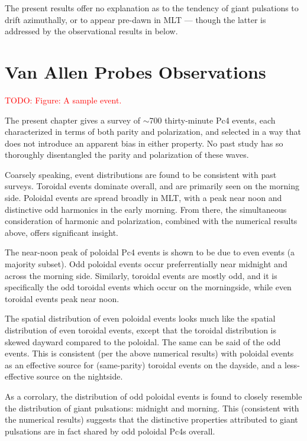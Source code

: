 \documentclass{article}
\newcommand{\about}{\ensuremath{\sim}}
\newcommand{\todo}[1]{ \textcolor{red}{TODO: #1} }
\begin{document}
The present results offer no explanation as to the tendency of giant
pulsations to drift azimuthally, or to appear pre-dawn in MLT --- though
the latter is addressed by the observational results in below.


\section{Van Allen Probes Observations}

\todo{Figure: A sample event.}

The present chapter gives a survey of \about700 thirty-minute Pc4
events, each characterized in terms of both parity and polarization, and
selected in a way that does not introduce an apparent bias in either
property. No past study has so thoroughly disentangled the parity and
polarization of these waves.

Coarsely speaking, event distributions are found to be consistent with
past surveys. Toroidal events dominate overall, and are primarily seen
on the morning side. Poloidal events are spread broadly in MLT, with a
peak near noon and distinctive odd harmonics in the early morning. From
there, the simultaneous consideration of harmonic and polarization,
combined with the numerical results above, offers significant insight.

The near-noon peak of poloidal Pc4 events is shown to be due to even
events (a majority subset). Odd poloidal events occur preferrentially
near midnight and across the morning side. Similarly, toroidal events
are mostly odd, and it is specifically the odd toroidal events which
occur on the morningside, while even toroidal events peak near noon.

The spatial distribution of even poloidal events looks much like the
spatial distribution of even toroidal events, except that the toroidal
distribution is skewed dayward compared to the poloidal. The same can be
said of the odd events. This is consistent (per the above numerical
results) with poloidal events as an effective source for (same-parity)
toroidal events on the dayside, and a less-effective source on the
nightside.

As a corrolary, the distribution of odd poloidal events is found to
closely resemble the distribution of giant pulsations: midnight and
morning. This (consistent with the numerical results) suggests that the
distinctive properties attributed to giant pulsations are in fact shared
by odd poloidal Pc4s overall.
\end{document}
